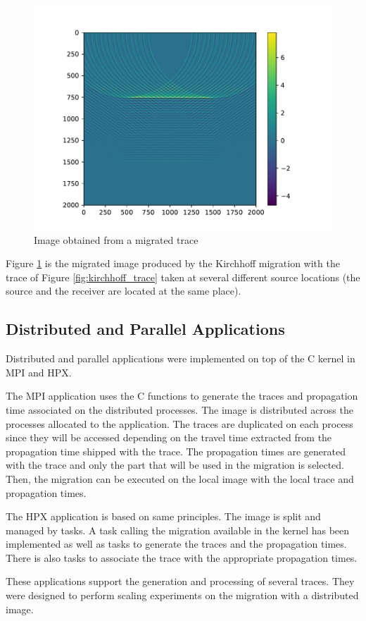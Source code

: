 \begin{figure}[H]
	\centering
	\includegraphics[width=.7\textwidth]{img.pdf}
	\caption{Image obtained from a migrated trace\label{fig:kirchhoff_image}}
\end{figure}
Figure \ref{fig:kirchhoff_image} is the migrated image produced by the Kirchhoff migration with the trace of Figure \ref{fig:kirchhoff_trace} taken at several different source locations (the source and the receiver are located at the same place).

\subsection{Distributed and Parallel Applications}
Distributed and parallel applications were implemented on top of the C kernel in MPI and HPX.

The MPI application uses the C functions to generate the traces and propagation time associated on the distributed processes.
The image is distributed across the processes allocated to the application.
The traces are duplicated on each process since they will be accessed depending on the travel time extracted from the propagation time shipped with the trace.
The propagation times are generated with the trace and only the part that will be used in the migration is selected.
Then, the migration can be executed on the local image with the local trace and propagation times.

The HPX application is based on same principles.
The image is split and managed by tasks.
A task calling the migration available in the kernel has been implemented as well as tasks to generate the traces and the propagation times.
There is also tasks to associate the trace with the appropriate propagation times.

These applications support the generation and processing of several traces.
They were designed to perform scaling experiments on the migration with a distributed image.

